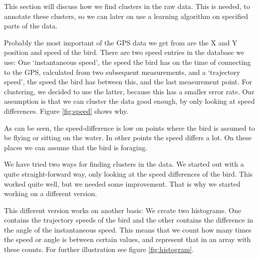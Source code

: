  This section will discuss how we find clusters in the raw data. 
 This is needed, to annotate these clusters, so we can later on use a
 learning algorithm on specified parts of the data.

     Probably the most important of the GPS data we get from \bits are the X and Y
     position and speed of the bird. There are two speed entries in the database we
     use: One `instantaneous speed', the speed the bird has on the time of
     connecting to the GPS, calculated from two subsequent measurements, and a
     `trajectory speed', the speed the bird has between this, and the last
     measurement point. For clustering, we decided to use the latter, because this
     has a smaller error rate. Our assumption is that we can cluster the data good
     enough, by only looking at speed differences. Figure \ref{fig:speed} shows
     why.

 As can be seen, the speed-difference is low on points where the bird is assumed
 to be flying or sitting on the water. In other points the speed differs a lot.
 On these places we can assume that the bird is foraging.

 We have tried two ways for finding clusters in the data. We started out with a
 quite straight-forward way, only looking at the speed differences of the bird.
 This worked quite well, but we needed some improvement. That is why we started
 working on a different version.

 This different version works on another basis: We create two histograms. One
 contains the trajectory speeds of the bird and the other contains the
 difference in the angle of the instantaneous speed. This means that we count
 how many times the speed or angle is between certain values, and represent that
 in an array with these counts. For further illustration see figure
 \ref{fig:histogram}.

